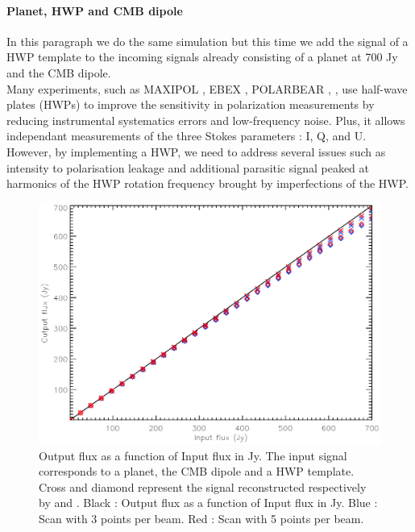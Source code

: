 
\paragraph{Planet, HWP and CMB dipole \\}

In this paragraph we do the same simulation but this time we add the signal of a HWP template to the incoming signals already consisting of a planet at 700 Jy and the CMB dipole.\\
Many experiments, such as MAXIPOL \citep{2007ApJ...665...42J}, EBEX \citep{2010SPIE.7741E..1CR}, POLARBEAR \citep{2017JCAP...05..008T},  \citep{2017A&A...599A..34R}, use half-wave plates (HWPs) to improve the sensitivity in polarization measurements by reducing instrumental systematics errors and low-frequency noise. Plus, it allows independant measurements of the three Stokes parameters : I, Q, and U. However, by implementing a HWP, we need to address several issues such as intensity to polarisation leakage and additional parasitic signal peaked at harmonics of the HWP rotation frequency brought by imperfections of the HWP.

\begin{figure}[h]
\center
	\includegraphics[scale=0.5]{Figures/NL-planet-hwp-dipole.eps}
	\caption{Output flux as a function of Input flux in Jy. 
	The input signal corresponds to a planet, the CMB dipole and a HWP template. Cross and diamond represent the signal reconstructed respectively by \cf and \rf. Black : Output flux as a function of Input flux in Jy. Blue : Scan with 3 points per beam. Red : Scan with 5 points per beam.}
	\label{fig:nl-planet-hwp-dipole}
\end{figure}

